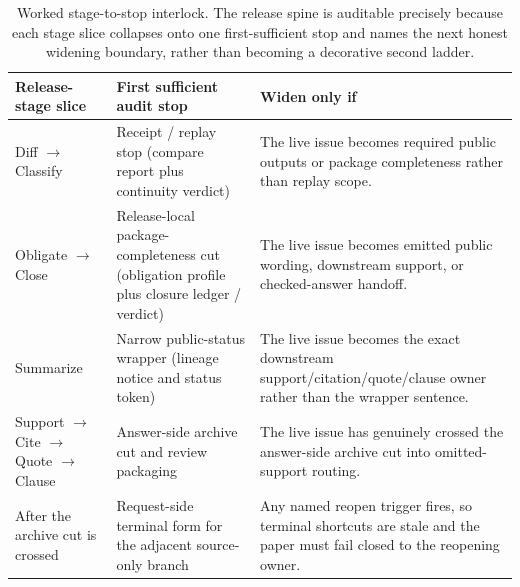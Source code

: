 \documentclass[11pt]{article}
\begin{document}
\begin{table}[t]
\centering
\small
\begin{tabularx}{\linewidth}{@{}l l X@{}}
\toprule
Release-stage slice & First sufficient audit stop & Widen only if \\
\midrule
Diff $\to$ Classify & Receipt / replay stop (compare report plus continuity verdict) & The live issue becomes required public outputs or package completeness rather than replay scope. \\
Obligate $\to$ Close & Release-local package-completeness cut (obligation profile plus closure ledger / verdict) & The live issue becomes emitted public wording, downstream support, or checked-answer handoff. \\
Summarize & Narrow public-status wrapper (lineage notice and status token) & The live issue becomes the exact downstream support/citation/quote/clause owner rather than the wrapper sentence. \\
Support $\to$ Cite $\to$ Quote $\to$ Clause & Answer-side archive cut and review packaging & The live issue has genuinely crossed the answer-side archive cut into omitted-support routing. \\
After the archive cut is crossed & Request-side terminal form for the adjacent source-only branch & Any named reopen trigger fires, so terminal shortcuts are stale and the paper must fail closed to the reopening owner. \\
\bottomrule
\end{tabularx}
\caption{Worked stage-to-stop interlock. The release spine is auditable precisely because each stage slice collapses onto one first-sufficient stop and names the next honest widening boundary, rather than becoming a decorative second ladder.}
\label{tab:workedexample-stage-stop-interlock}
\end{table}
\end{document}
